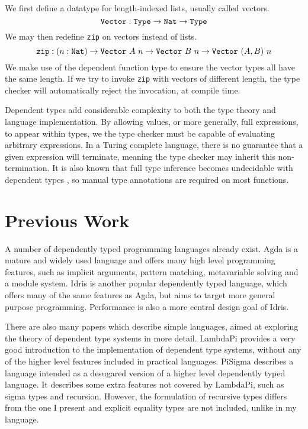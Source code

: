 \documentclass[12pt,a4paper,twoside]{report}
\begin{document}
We first define a datatype for length-indexed lists, usually called vectors.
\[
    \texttt{Vector} : \mathtt{Type} \rightarrow \texttt{Nat} \rightarrow \mathtt{Type}
\]
We may then redefine \texttt{zip} on vectors instead of lists.
\[
    \texttt{zip} : (n : \texttt{Nat}) \rightarrow \texttt{Vector}\ A\ n \rightarrow \texttt{Vector}\ B\ n \rightarrow \texttt{Vector}\ (A, B)\ n
\]
We make use of the dependent function type to ensure the vector types all have the same length.
If we try to invoke \texttt{zip} with vectors of different length, the type checker will automatically reject the invocation, at compile time.

Dependent types add considerable complexity to both the type theory and language implementation.
By allowing values, or more generally, full expressions, to appear within types, we  the type checker must be capable of evaluating arbitrary expressions.
In a Turing complete language, there is no guarantee that a given expression will terminate, meaning the type checker may inherit this non-termination.
It is also known that full type inference becomes undecidable with dependent types \cite{gilles93}, so manual type annotations are required on most functions.

\section{Previous Work}

A number of dependently typed programming languages already exist.
Agda \cite{norell07} is a mature and widely used language and offers many high level programming features, such as implicit arguments, pattern matching, metavariable solving and a module system.
Idris \cite{brady13} is another popular dependently typed language, which offers many of the same features as Agda, but aims to target more general purpose programming.
Performance is also a more central design goal of Idris.

There are also many papers which describe simple languages, aimed at exploring the theory of dependent type systems in more detail.
LambdaPi \cite{loeh10} provides a very good introduction to the implementation of dependent type systems, without any of the higher level features included in practical languages.
PiSigma \cite{thorsten10} describes a language intended as a desugared version of a higher level dependently typed language.
It describes some extra features not covered by LambdaPi, such as sigma types and recursion.
However, the formulation of recursive types differs from the one I present and explicit equality types are not included, unlike in my language.
\end{document}
